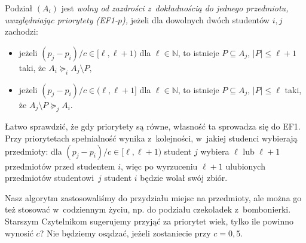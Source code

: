 { 
Podział $(A_i)$ jest \emph{\color{magenta} wolny od zazdrości z~dokładnością do jednego przedmiotu, uwzględniając priorytety (EF1-$p$),} jeżeli dla dowolnych dwóch studentów $i,j$ zachodzi:
\begin{itemize}[parsep=0pt,topsep=0pt,itemsep=0pt,partopsep=0pt,leftmargin=40pt]
\item jeżeli $(p_j-p_i)/c \in [\ell,\ell+1)$ dla $\ell \in \mathbb{N}$, to istnieje $P \subseteq A_j$, $|P| \le \ell+1$ taki, że $A_i \succeq_i A_j \setminus P,$
\item jeżeli $(p_j-p_i)/c \in (\ell,\ell+1]$ dla $\ell \in \mathbb{N}$, to
istnieje $P \subseteq A_j$, $|P| \le \ell$ taki, że $A_j \setminus P \succeq_j A_i$.
\end{itemize}
\par}

Łatwo sprawdzić, że gdy priorytety są równe, własność ta sprowadza się do EF1.
Przy priorytetach spełnialność wynika z~kolejności, w~jakiej studenci wybierają przedmioty: dla $(p_j-p_i)/c \in [\ell,\ell+1)$ student $j$ wybiera $\ell$ lub $\ell+1$ przedmiotów przed studentem $i$, więc po wyrzuceniu $\ell+1$ ulubionych przedmiotów studentowi~$j$ student $i$ będzie wolał swój zbiór. 

Nasz algorytm zastosowaliśmy do przydziału miejsc na przedmioty, ale można go też stosować w~codziennym życiu, np. do podziału czekoladek z~bombonierki. Starszym Czytelnikom sugerujemy przyjąć za priorytet wiek, tylko ile powinno wynosić $c$? Nie będziemy osądzać, jeżeli zostaniecie przy $c=0{,}5$.



